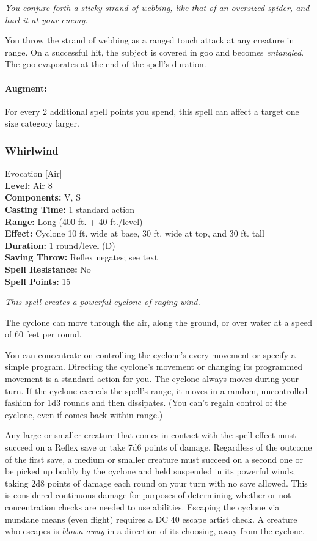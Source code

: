 \emph{You conjure forth a sticky strand of webbing, like that of an oversized spider, and hurl it at your enemy.}

You throw the strand of webbing as a ranged touch attack at any creature in range. 
On a successful hit, the subject is covered in goo and becomes \emph{entangled}. 
The goo evaporates at the end of the spell's duration.

\paragraph{Augment:} For every 2 additional spell points you spend, this spell can affect a target one size category larger.

\subsubsection{Whirlwind}
\label{Spell:Whirlwind}
Evocation [Air]
\\ \textbf{Level:} Air 8
\\ \textbf{Components:} V, S
\\ \textbf{Casting Time:} 1 standard action
\\ \textbf{Range:} Long (400 ft. + 40 ft./level)
\\ \textbf{Effect:} Cyclone 10 ft. wide at base, 30 ft. wide at top, and 30 ft. tall
\\ \textbf{Duration:} 1 round/level (D)
\\ \textbf{Saving Throw:} Reflex negates; see text
\\ \textbf{Spell Resistance:} No
\\ \textbf{Spell Points:} 15

\emph{This spell creates a powerful cyclone of raging wind.} 

The cyclone can move through the air, along the ground, or over water at a speed of 60 feet per round. 

You can concentrate on controlling the cyclone's every movement or specify a simple program. 
Directing the cyclone's movement or changing its programmed movement is a standard action for you. 
The cyclone always moves during your turn. 
If the cyclone exceeds the spell's range, it moves in a random, uncontrolled fashion for 1d3 rounds and then dissipates. (You can't regain control of the cyclone, even if comes back within range.)

Any large or smaller creature that comes in contact with the spell effect must succeed on a Reflex save or take 7d6 points of damage. 
Regardless of the outcome of the first save, a medium or smaller creature must succeed on a second one or be picked up bodily by the cyclone and held suspended in its powerful winds, taking 2d8 points of damage each round on your turn with no save allowed. This is considered continuous damage for purposes of determining whether or not concentration checks are needed to use abilities. Escaping the cyclone via mundane means (even flight) requires a DC 40 escape artist check. A creature who escapes is \emph{blown away} in a direction of its choosing, away from the cyclone.

